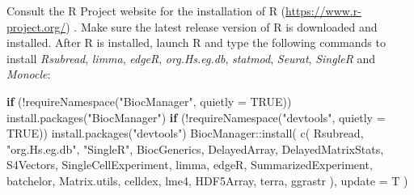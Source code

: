 \documentclass[
  openany]{book}
\newenvironment{Shaded}{\begin{snugshade}}{\end{snugshade}}
\newcommand{\AttributeTok}[1]{\textcolor[rgb]{0.77,0.63,0.00}{#1}}
\newcommand{\ConstantTok}[1]{\textcolor[rgb]{0.00,0.00,0.00}{#1}}
\newcommand{\ControlFlowTok}[1]{\textcolor[rgb]{0.13,0.29,0.53}{\textbf{#1}}}
\newcommand{\FunctionTok}[1]{\textcolor[rgb]{0.00,0.00,0.00}{#1}}
\newcommand{\NormalTok}[1]{#1}
\newcommand{\SpecialCharTok}[1]{\textcolor[rgb]{0.00,0.00,0.00}{#1}}
\newcommand{\StringTok}[1]{\textcolor[rgb]{0.31,0.60,0.02}{#1}}
\begin{document}
Consult the R Project website for the installation of R (\url{https://www.r-project.org/}) \citep{R-base}. Make sure the latest release version of R is downloaded and installed. After R is installed, launch R and type the following commands to install \emph{Rsubread}, \emph{limma}, \emph{edgeR}, \emph{org.Hs.eg.db}, \emph{statmod}, \emph{Seurat}, \emph{SingleR} and \emph{Monocle}:

\begin{Shaded}
\begin{Highlighting}[]
\ControlFlowTok{if}\NormalTok{ (}\SpecialCharTok{!}\FunctionTok{requireNamespace}\NormalTok{(}\StringTok{"BiocManager"}\NormalTok{, }\AttributeTok{quietly =} \ConstantTok{TRUE}\NormalTok{))}
  \FunctionTok{install.packages}\NormalTok{(}\StringTok{"BiocManager"}\NormalTok{)}
\ControlFlowTok{if}\NormalTok{ (}\SpecialCharTok{!}\FunctionTok{requireNamespace}\NormalTok{(}\StringTok{"devtools"}\NormalTok{, }\AttributeTok{quietly =} \ConstantTok{TRUE}\NormalTok{))}
  \FunctionTok{install.packages}\NormalTok{(}\StringTok{"devtools"}\NormalTok{)}
\NormalTok{BiocManager}\SpecialCharTok{::}\FunctionTok{install}\NormalTok{(}
  \FunctionTok{c}\NormalTok{(}
    \StringTok{\textquotesingle{}Rsubread\textquotesingle{}}\NormalTok{,}
    \StringTok{"org.Hs.eg.db"}\NormalTok{,}
    \StringTok{"SingleR"}\NormalTok{,}
    \StringTok{\textquotesingle{}BiocGenerics\textquotesingle{}}\NormalTok{,}
    \StringTok{\textquotesingle{}DelayedArray\textquotesingle{}}\NormalTok{,}
    \StringTok{\textquotesingle{}DelayedMatrixStats\textquotesingle{}}\NormalTok{,}
    \StringTok{\textquotesingle{}S4Vectors\textquotesingle{}}\NormalTok{,}
    \StringTok{\textquotesingle{}SingleCellExperiment\textquotesingle{}}\NormalTok{,}
    \StringTok{\textquotesingle{}limma\textquotesingle{}}\NormalTok{,}
    \StringTok{\textquotesingle{}edgeR\textquotesingle{}}\NormalTok{,}
    \StringTok{\textquotesingle{}SummarizedExperiment\textquotesingle{}}\NormalTok{,}
    \StringTok{\textquotesingle{}batchelor\textquotesingle{}}\NormalTok{,}
    \StringTok{\textquotesingle{}Matrix.utils\textquotesingle{}}\NormalTok{,}
    \StringTok{\textquotesingle{}celldex\textquotesingle{}}\NormalTok{,}
    \StringTok{\textquotesingle{}lme4\textquotesingle{}}\NormalTok{,}
    \StringTok{\textquotesingle{}HDF5Array\textquotesingle{}}\NormalTok{,}
    \StringTok{\textquotesingle{}terra\textquotesingle{}}\NormalTok{,}
    \StringTok{\textquotesingle{}ggrastr\textquotesingle{}}
\NormalTok{  ),}
  \AttributeTok{update =}\NormalTok{ T}
\NormalTok{)}


\end{Highlighting}
\end{Shaded}
\end{document}
